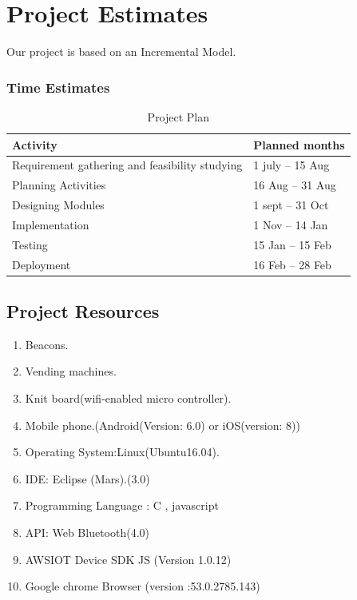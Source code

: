 \documentclass[oneside,a4paper,12pt]{report}
\begin{document}
\section{Project Estimates}
 Our project is based on an Incremental Model. 
 
\subsubsection{Time Estimates}

\begin{table}[!htbp]
\begin{center}
\def\arraystretch{1.5}
\begin{tabularx}{\textwidth}{| X | X |}
\hline
Activity	& Planned months\\
\hline
Requirement gathering and feasibility studying        &1 july – 15 Aug\\
\hline
Planning Activities       &16 Aug – 31 Aug\\
\hline
Designing Modules        &1 sept – 31 Oct\\
\hline
Implementation           &1 Nov – 14 Jan\\
\hline
Testing                  &15 Jan – 15 Feb\\
\hline
Deployment               &16 Feb – 28 Feb\\
\hline



\end{tabularx}
\end{center}
\caption{Project Plan}
\label{tab:usecase}
\end{table}
\newpage
\subsection{Project Resources}
\begin{enumerate}
\item Beacons.
\item Vending machines.
\item Knit board(wifi-enabled micro controller).
\item Mobile phone.(Android(Version: 6.0) or iOS(version: 8))
\item Operating System:Linux(Ubuntu16.04). 
\item IDE: Eclipse (Mars).(3.0)
\item Programming Language : C , javascript
\item API: Web Bluetooth(4.0)
\item AWSIOT Device SDK JS (Version 1.0.12)
\item Google chrome Browser (version :53.0.2785.143)
\end{enumerate}
\end{document}
